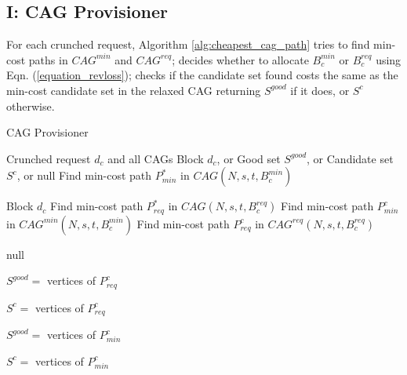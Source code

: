 \documentclass[journal]{IEEEtran}
\begin{document}

\subsection{\textbf{I: CAG Provisioner}}\label{subsection:fitindegradable}

For each crunched request, Algorithm \ref{alg:cheapest_cag_path} tries to find min-cost paths in $CAG^{min}$ and $CAG^{req}$; decides whether to allocate $B_{c}^{min}$ or $B_{c}^{req}$ using Eqn. (\ref{equation_revloss}); checks if the candidate set found costs the same as the min-cost candidate set in the relaxed CAG returning $S^{good}$ if it does, or $S^c$ otherwise. 

\begin{algorithm}[!t]
\caption{CAG Provisioner}
\scriptsize
\label{alg:cheapest_cag_path}
 \begin{algorithmic}[1] 
 \renewcommand{\algorithmicrequire}{\textbf{Input:}}
 \renewcommand{\algorithmicensure}{\textbf{Output:}}
 \Require Crunched request $d_c$ and all CAGs
 \Ensure Block $d_c$, or Good set $S^{good}$, or Candidate set $S^{c}$, or null
 \State Find min-cost path $P^{*}_{min}$ in $CAG(N, s, t, B^{min}_{c})$ \label{alg:line:short_path}
 
 \Return Block $d_c$ \label{alg:line:short_path:not_found}
 \EndIf
 \State Find min-cost path $P^{*}_{req}$ in $CAG(N, s, t, B^{req}_{c})$ 
 \State Find min-cost path $P^{c}_{min}$ in $CAG^{min}(N, s, t, B^{min}_{c})$ 
 \State Find min-cost path $P^{c}_{req}$ in $CAG^{req}(N, s, t, B^{req}_{c})$
 \label{alg:line:short_capacitated_path}
 
 	\Return null
 \EndIf
 
 
 	\Return $S^{good} =$ vertices of $P^{c}_{req}$
 \Else
 
 	\Return $S^{c} =$ vertices of $P^{c}_{req}$
 \EndIf
 \Else
 
 	\Return $S^{good} =$ vertices of $P^{c}_{min}$
 \Else
 
 	\Return $S^{c} =$ vertices of $P^{c}_{min}$
 \EndIf
 \EndIf
 \end{algorithmic}
 \end{algorithm}
 
\end{document}
